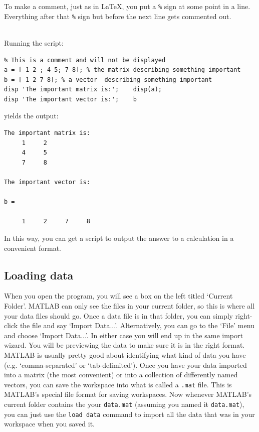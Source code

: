 To make a comment, just as in \LaTeX , you put a \texttt{\%} sign at some point in a line. Everything after that \texttt{\%} sign but before the next line gets commented out.
\begin{example}
\hfill \\
Running the script:
\begin{framed}
\begin{verbatim}
% This is a comment and will not be displayed
a = [ 1 2 ; 4 5; 7 8]; % the matrix describing something important
b = [ 1 2 7 8]; % a vector  describing something important
disp 'The important matrix is:'; 	disp(a);
disp 'The important vector is:'; 	b
\end{verbatim}
\end{framed}
yields the output:
\begin{framed}
\begin{verbatim}
The important matrix is:
     1     2
     4     5
     7     8

The important vector is:

b =

     1     2     7     8
\end{verbatim}
\end{framed}
 In this way, you can get a script to output the answer to a calculation in a convenient format.
\end{example}


\subsection{Loading data}\label{loadingdata}
When you open the program, you will see a box on the left titled `Current Folder'. MATLAB can only see the files in your current folder, so this is where all your data files should go. Once a data file is in that folder, you can simply right-click the file and say `Import Data...'. Alternatively, you can go to the `File' menu and choose `Import Data...'. In either case you will end up in the same import wizard. You will be previewing the data to make sure it is in the right format. MATLAB is usually pretty good about identifying what kind of data you have (e.g. `comma-separated' or `tab-delimited'). 
Once you have your data imported into a matrix (the most convenient) or into a collection of differently named vectors, you can save the workspace into what is called a \texttt{.mat} file. This is MATLAB's special file format for saving workspaces. Now whenever MATLAB's current folder contains the your \texttt{data.mat} (assuming you named it \texttt{data.mat}), you can just use the \texttt{load data} command to import all the data that was in your workspace when you saved it.

